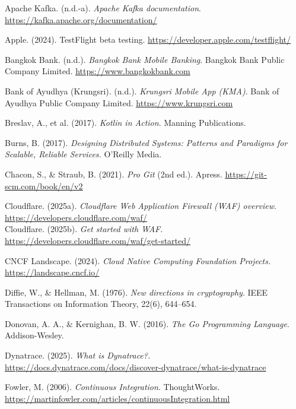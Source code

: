 Apache Kafka. (n.d.-a). \emph{Apache Kafka documentation}.
\href{https://kafka.apache.org/documentation/}{\ul{https://kafka.apache.org/documentation/}}

Apple. (2024). TestFlight beta testing.
\href{https://developer.apple.com/testflight/}{\ul{https://developer.apple.com/testflight/}}

Bangkok Bank. (n.d.). \emph{Bangkok Bank Mobile Banking}. Bangkok Bank
Public Company Limited.
\href{https://www.bangkokbank.com}{\ul{https://www.bangkokbank.com}}

Bank of Ayudhya (Krungsri). (n.d.). \emph{Krungsri Mobile App (KMA)}.
Bank of Ayudhya Public Company Limited.
\href{https://www.krungsri.com}{\ul{https://www.krungsri.com}}

Breslav, A., et al. (2017). \emph{Kotlin in Action}. Manning
Publications.

Burns, B. (2017). \emph{Designing Distributed Systems: Patterns and
Paradigms for Scalable, Reliable Services.} O'Reilly Media.

Chacon, S., \& Straub, B. (2021). \emph{Pro Git} (2nd ed.). Apress.
\href{https://git-scm.com/book/en/v2}{\ul{https://git-scm.com/book/en/v2}}

Cloudflare. (2025a). \emph{Cloudflare Web Application Firewall (WAF)
overview}.
\href{https://developers.cloudflare.com/waf/}{\ul{https://developers.cloudflare.com/waf/}}\\
Cloudflare. (2025b). \emph{Get started with WAF}.
\href{https://developers.cloudflare.com/waf/get-started/}{\ul{https://developers.cloudflare.com/waf/get-started/}}

CNCF Landscape. (2024). \emph{Cloud Native Computing Foundation
Projects.}
\href{https://landscape.cncf.io/}{\ul{https://landscape.cncf.io/}}

Diffie, W., \& Hellman, M. (1976). \emph{New directions in
cryptography}. IEEE Transactions on Information Theory, 22(6), 644--654.

Donovan, A. A., \& Kernighan, B. W. (2016). \emph{The Go Programming
Language}. Addison-Wesley.

Dynatrace. (2025). \emph{What is Dynatrace?.}
\href{https://docs.dynatrace.com/docs/discover-dynatrace/what-is-dynatrace}{\ul{https://docs.dynatrace.com/docs/discover-dynatrace/what-is-dynatrace}}

Fowler, M. (2006). \emph{Continuous Integration}. ThoughtWorks.
\href{https://martinfowler.com/articles/continuousIntegration.html}{\ul{https://martinfowler.com/articles/continuousIntegration.html}}

